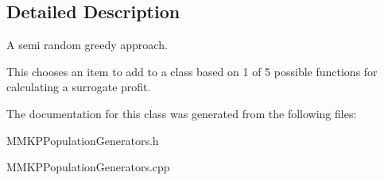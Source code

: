 \subsection{Detailed Description}
A semi random greedy approach. 

This chooses an item to add to a class based on 1 of 5 possible functions for calculating a surrogate profit. 

The documentation for this class was generated from the following files\+:\begin{DoxyCompactItemize}
\item 
M\+M\+K\+P\+Population\+Generators.\+h\item 
M\+M\+K\+P\+Population\+Generators.\+cpp\end{DoxyCompactItemize}

